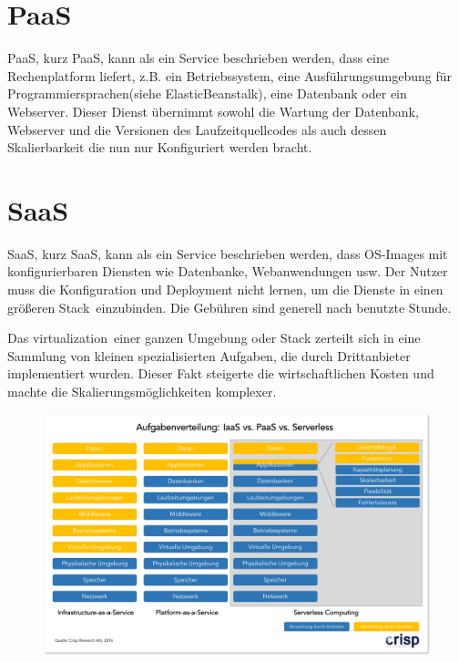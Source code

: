 \documentclass[
12pt,
english,
ngerman,
headsepline,
twoside,
openright,
numbers=noenddot,version=first
]{scrreprt}
\begin{document}
\section{PaaS}
\label{sec:paas}
\acrfull{PaaS}, kurz \acrshort{PaaS}, kann als ein Service beschrieben werden, dass eine Rechenplatform liefert, z.B. ein Betriebssystem, eine Ausführungsumgebung für Programmiersprachen(siehe ElasticBeanstalk), eine Datenbank oder ein Webserver. Dieser Dienst übernimmt sowohl die Wartung der Datenbank, Webserver und die Versionen des Laufzeitquellcodes als auch dessen Skalierbarkeit die nun nur Konfiguriert werden bracht\cite{patternAWS}.

\section{SaaS} 
\label{sec:saas}
\acrfull{SaaS}, kurz \acrshort{SaaS}, kann als ein Service beschrieben werden, dass OS-Images mit konfigurierbaren Diensten wie Datenbanke, Webanwendungen usw. Der Nutzer muss die Konfiguration und Deployment nicht lernen, um die Dienste in einen größeren \glqq Stack\grqq\ einzubinden. Die Gebühren sind generell nach benutzte Stunde. 


Das \glqq\Gls{virtualization}\grqq\ einer ganzen Umgebung oder Stack zerteilt sich in eine Sammlung von kleinen spezialisierten Aufgaben, die durch Drittanbieter implementiert wurden. Dieser Fakt steigerte die wirtschaftlichen Kosten und machte die Skalierungsmöglichkeiten komplexer\cite{patternAWS}.

\begin{figure}[h]
	\includegraphics[scale=0.36]{./pics/IaaS_vs_PaaS_vs_Serverless.png}
\end{figure}
\end{document}
